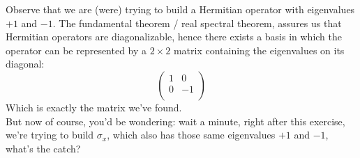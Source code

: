\documentclass[solutions.tex]{subfiles}
\begin{document}
\begin{remark} Observe that we are (were) trying to build
a Hermitian operator with eigenvalues $+1$ and $-1$. The fundamental
theorem / real spectral theorem, assures us that Hermitian operators
are diagonalizable, hence there exists a basis in which the operator
can be represented by a $2\times 2$ matrix containing the eigenvalues
on its diagonal:
\[
	\begin{pmatrix}
		1 & 0 \\
		0 & -1 \\
	\end{pmatrix}
\]
Which is exactly the matrix we've found. \\

But now of course, you'd be wondering: wait a minute, right after
this exercise, we're trying to build $\sigma_x$, which also has
those same eigenvalues $+1$ and $-1$, what's the catch? \\


\end{remark}
\end{document}
